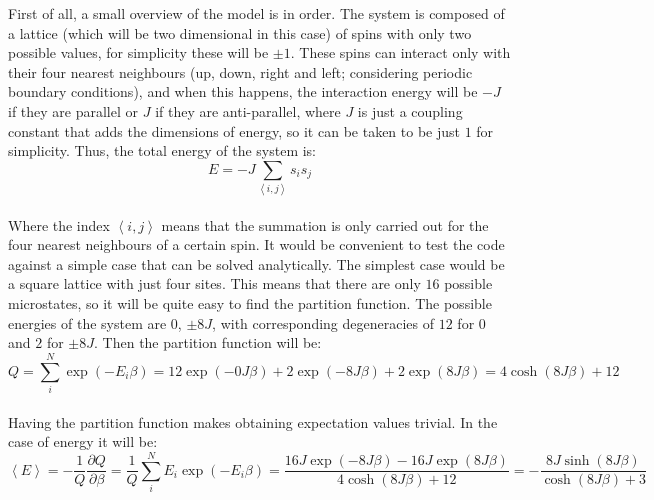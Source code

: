 \documentclass[11pt,a4paper,oneside]{article}
\begin{document}
		First of all, a small overview of the model is in order. The system is composed of a lattice (which will be two dimensional in this case) of spins with only two possible values, for simplicity these will be $\pm1$. These spins can interact only with their four nearest neighbours (up, down, right and left; considering periodic boundary conditions), and when this happens, the interaction energy will be $-J$ if they are parallel or $J$ if they are anti-parallel, where $J$ is just a coupling constant that adds the dimensions of energy, so it can be taken to be just $1$ for simplicity. Thus, the total energy of the system is:\\
	
		\begin{equation*}E=-J\sum_{\left<i,j\right>}{s_is_j}\end{equation*}\\
		
		Where the index $\left<i,j\right>$ means that the summation is only carried out for the four nearest neighbours of a certain spin. It would be convenient to test the code against a simple case that can be solved analytically. The simplest case would be a square lattice with just four sites. This means that there are only $16$ possible microstates, so it will be quite easy to find the partition function. The possible energies of the system are $0$, $\pm8J$, with corresponding degeneracies of $12$ for $0$ and $2$ for $\pm8J$. Then the partition function will be:\\
		
		\begin{equation*}Q=\sum_i^N{\exp{\left(-E_i\beta\right)}}=12\exp{\left(-0J\beta\right)}+2\exp{\left(-8J\beta\right)}+2\exp{\left(8J\beta\right)}=4\cosh{\left(8J\beta\right)}+12\end{equation*}\\
		
		Having the partition function makes obtaining expectation values trivial. In the case of energy it will be:\\
		
		\begin{equation*}\left<E\right>=-\frac{1}{Q}\frac{\partial Q}{\partial\beta}=\frac{1}{Q}\sum_i^N{E_i\exp{\left(-E_i\beta\right)}}=\frac{16J\exp{\left(-8J\beta\right)}-16J\exp{\left(8J\beta\right)}}{4\cosh{\left(8J\beta\right)}+12}=-\frac{8J\sinh{\left(8J\beta\right)}}{\cosh{\left(8J\beta\right)}+3}\end{equation*}\\
		
\end{document}
